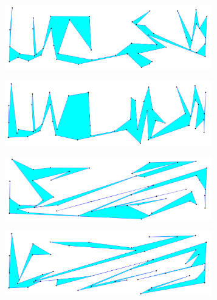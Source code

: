 \documentclass[conference]{IEEEtran}
\begin{document}
		\begin{figure}[htbp]
			\centering
			\begin{subfigure}{0.85\linewidth}
				\centering
				\includegraphics[width=0.99\textwidth]{fig6a.png}
				\caption{}
				\label{fig6a}
			\end{subfigure}
			
			\begin{subfigure}{0.85\linewidth}
				\centering
				\includegraphics[width=0.99\textwidth]{fig6b.png}
				\caption{}
				\label{fig6b}
			\end{subfigure}
			
			\begin{subfigure}{0.85\linewidth}
				\centering
				\includegraphics[width=0.99\textwidth]{fig6c.png}
				\caption{}
				\label{fig6c}
			\end{subfigure}
			
			\begin{subfigure}{0.85\linewidth}
				\centering
				\includegraphics[width=0.99\textwidth]{fig6d.png}
				\caption{}
				\label{fig6d}
			\end{subfigure}
			

\end{figure}
\end{document}
